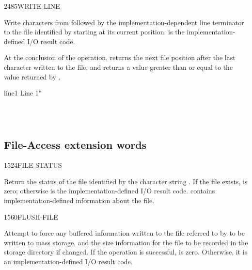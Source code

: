 \begin{worddef}{2485}{WRITE-LINE}
\item {}

	Write  characters from  followed by the
	implementation-dependent line terminator to the file identified
	by  starting at its current position.  is
	the implementation-defined I/O result code.

	At the conclusion of the operation,  returns
	the next file position after the last character written to the
	file, and  returns a value greater than or equal
	to the value returned by .


	\begin{testing} %
		\ttfamily
		\word{:} line1  Line 1" \word{;}

		 \\
		 \\
	\end{testing}
\end{worddef}


\subsection{File-Access extension words} %
\vspace{1ex}
\extended
\vspace{1ex}

\begin{worddef}{1524}{FILE-STATUS}
\item {}

	Return the status of the file identified by the character string
	. If the file exists,  is zero;
	otherwise  is the implementation-defined I/O result
	code.  contains implementation-defined information about
	the file.
\end{worddef}


\begin{worddef}{1560}{FLUSH-FILE}
\item {}

	Attempt to force any buffered information written to the file
	referred to by  to be written to mass storage, and
	the size information for the file to be recorded in the storage
	directory if changed. If the operation is successful, 
	is zero. Otherwise, it is an implementation-defined I/O result
	code.
\end{worddef}


